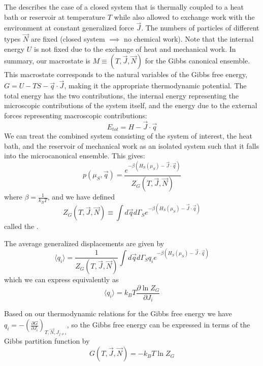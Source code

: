 \documentclass[12pt, a4paper, oneside, openright, titlepage]{book}
\begin{document}
The  describes the case of a closed system that is thermally coupled to a heat bath or reservoir at temperature $T$ while also allowed to exchange work with the environment at constant generalized force $\vec{J}$. The numbers of particles of different types $\vec{N}$ are fixed (closed system $\implies$ no chemical work). Note that the internal energy $U$ is not fixed due to the exchange of heat and mechanical work. In summary, our macrostate is $M \equiv (T,\vec{J},\vec{N})$ for the Gibbs canonical ensemble. This macrostate corresponds to the natural variables of the Gibbs free energy, $G = U - TS - \vec{q}\cdot\vec{J}$, making it the appropriate thermodynamic potential. The total energy has the two contributions, the internal energy representing the microscopic contributions of the system itself, and the energy due to the external forces representing macroscopic contributions: \begin{equation*}
    E_{tot} = H - \vec{J}\cdot \vec{q}
\end{equation*}
We can treat the combined system consisting of the system of interest, the heat bath, and the reservoir of mechanical work as an isolated system such that it falls into the microcanonical ensemble. This gives: \begin{equation*}
    p(\mu_S,\vec{q}) = \frac{e^{-\beta(H_S(\mu_S)-\vec{J}\cdot\vec{q})}}{Z_G(T,\vec{J},\vec{N})}
\end{equation*}
where $\beta = \frac{1}{k_BT}$, and we have defined \begin{equation*}
    Z_G(T,\vec{J},\vec{N}) \equiv \int d\vec{q}d\Gamma_Se^{-\beta(H_S(\mu_S)-\vec{J}\cdot\vec{q})}
\end{equation*}
called the .

\begin{defn}
    The average generalized displacements are given by \begin{equation*}
        \langle q_i\rangle = \frac{1}{Z_G(T,\vec{J},\vec{N})} \int d\vec{q}d\Gamma_S q_ie^{-\beta(H_S(\mu_S) - \vec{J}\cdot\vec{q})} 
    \end{equation*}
    which we can express equivalently as \begin{equation*}
        \langle q_i\rangle = k_BT\frac{\partial \ln Z_G}{\partial J_i}
    \end{equation*}
\end{defn}
Based on our thermodynamic relations for the Gibbs free energy we have $q_i = -\left(\frac{\partial G}{\partial J_i}\right)_{T,\vec{N},J_{j\neq i}}$, so the Gibbs free energy can be expressed in terms of the Gibbs partition function by \begin{equation*}
    G(T,\vec{J},\vec{N}) = -k_BT\ln Z_G
\end{equation*}
\end{document}
